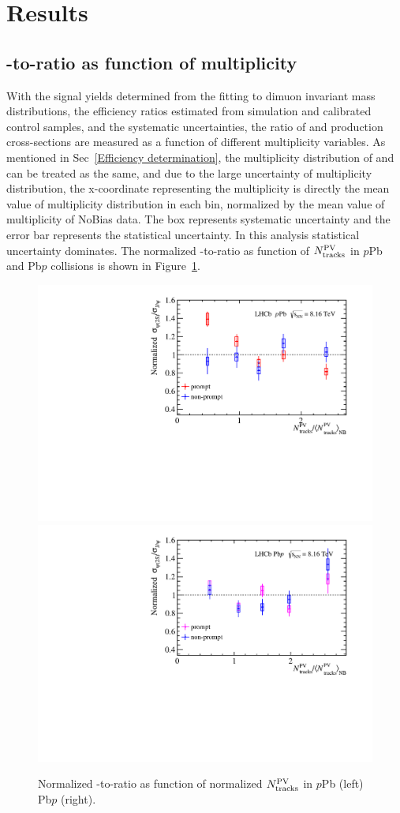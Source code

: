 \section{Results}
\label{Results}
\subsection{\psitwos-to-\jpsi ratio as function of multiplicity}
With the signal yields determined from the fitting to dimuon invariant mass distributions, the efficiency ratios estimated from simulation and calibrated control samples, and the systematic uncertainties, the ratio of \psitwos and \jpsi production cross-sections are measured as a function of different multiplicity variables. As mentioned in Sec~\ref{Efficiency determination}, the multiplicity distribution of \jpsi and \psitwos can be treated as the same, and due to the large uncertainty of \psitwos multiplicity distribution, the x-coordinate representing the multiplicity is directly the mean value of \jpsi multiplicity distribution in each bin, normalized by the mean value of multiplicity of NoBias data. The box represents systematic uncertainty and the error bar represents the statistical uncertainty. In this analysis statistical uncertainty dominates.
The normalized \psitwos-to-\jpsi ratio as function of $N_{\rm tracks}^{\rm PV}$ in $p$Pb and Pb$p$ collisions is shown in Figure~\ref{NormPVN}.
\begin{figure}[H]
\begin{center}
\includegraphics[width=0.49\linewidth]{pdf/pPb/Workdir/Result/All.pdf}
\includegraphics[width=0.49\linewidth]{pdf/Pbp/Workdir/Result/All.pdf}
\end{center}
\caption{Normalized \psitwos-to-\jpsi ratio as function of normalized $N_{\rm tracks}^{\rm PV}$ in $p$Pb (left) Pb$p$ (right).}
\label{NormPVN}
\end{figure}

